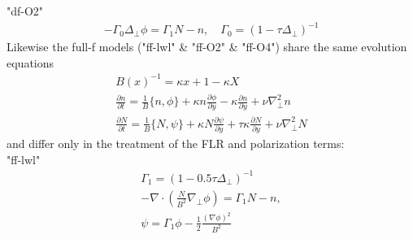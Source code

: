 "df-O2"
\begin{subequations}
\begin{align}
 -\Gamma_0\Delta_{\perp} \phi =  \Gamma_1 N -n, \quad \Gamma_0 = ( 1- \tau\Delta_{\perp})^{-1} 
\end{align}
\end{subequations}
Likewise the full-f models ("ff-lwl" \& "ff-O2" \& "ff-O4") share the same evolution equations
\begin{subequations}
\begin{align}
B(x)^{-1} = \kappa x +1-\kappa X \\ 
 \frac{\partial n}{\partial t}     = 
    \frac{1}{B}\{ n, \phi\} 
  + \kappa n\frac{\partial \phi}{\partial y} 
  -\kappa \frac{\partial n}{\partial y}
  + \nu \nabla_\perp^2 n  \\
  \frac{\partial N}{\partial t} =
  \frac{1}{B}\{ N, \psi\} 
  + \kappa N\frac{\partial \psi}{\partial y} 
  + \tau \kappa\frac{\partial N}{\partial y} +\nu\nabla_\perp^2N
\end{align}
\end{subequations}
and differ only in the treatment of the FLR and polarization terms:\\
"ff-lwl" 
\begin{subequations}
\begin{align}
\Gamma_1 = ( 1- 0.5\tau\Delta_{\perp})^{-1}\\
 -\nabla\cdot \left(\frac{N}{B^2} \nabla_\perp \phi\right) = \Gamma_1 N-n, \\
\psi = \Gamma_1 \phi - \frac{1}{2} \frac{(\nabla\phi)^2}{B^2}\\
\end{align}
\end{subequations}



